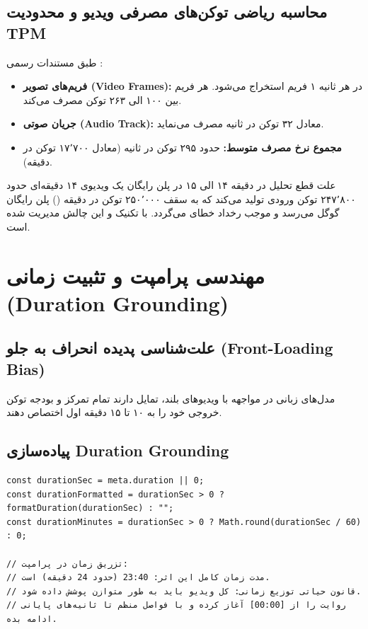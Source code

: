 \documentclass[11pt,a4paper]{report}
\begin{document}
\section{محاسبه ریاضی توکن‌های مصرفی ویدیو و محدودیت TPM}
طبق مستندات رسمی :
\begin{itemize}
    \item \textbf{فریم‌های تصویر (Video Frames):} در هر ثانیه ۱ فریم استخراج می‌شود. هر فریم بین ۱۰۰ الی ۲۶۳ توکن مصرف می‌کند.
    \item \textbf{جریان صوتی (Audio Track):} معادل ۳۲ توکن در ثانیه مصرف می‌نماید.
    \item \textbf{مجموع نرخ مصرف متوسط:} حدود ۲۹۵ توکن در ثانیه (معادل ۱۷٬۷۰۰ توکن در دقیقه).
\end{itemize}

\begin{warningbox}{علت قطع تحلیل در دقیقه ۱۴ الی ۱۵ در پلن رایگان}
یک ویدیوی ۱۴ دقیقه‌ای حدود ۲۴۷٬۸۰۰ توکن ورودی تولید می‌کند که به سقف ۲۵۰٬۰۰۰ توکن در دقیقه () پلن رایگان گوگل می‌رسد و موجب رخداد خطای  می‌گردد. با تکنیک  و  این چالش مدیریت شده است.
\end{warningbox}

\chapter{مهندسی پرامپت و تثبیت زمانی (Duration Grounding)}

\section{علت‌شناسی پدیده انحراف به جلو (Front-Loading Bias)}
مدل‌های زبانی در مواجهه با ویدیوهای بلند، تمایل دارند تمام تمرکز و بودجه توکن خروجی خود را به ۱۰ تا ۱۵ دقیقه اول اختصاص دهند.

\section{پیاده‌سازی Duration Grounding}
\begin{latin}
\begin{Verbatim}[frame=single,fontsize=\small]
const durationSec = meta.duration || 0;
const durationFormatted = durationSec > 0 ? formatDuration(durationSec) : "";
const durationMinutes = durationSec > 0 ? Math.round(durationSec / 60) : 0;

// تزریق زمان در پرامپت:
// مدت زمان کامل این اثر: 23:40 (حدود 24 دقیقه) است.
// قانون حیاتی توزیع زمانی: کل ویدیو باید به طور متوازن پوشش داده شود.
// روایت را از [00:00] آغاز کرده و با فواصل منظم تا ثانیه‌های پایانی ادامه بده.
\end{Verbatim}
\end{latin}
\end{document}
